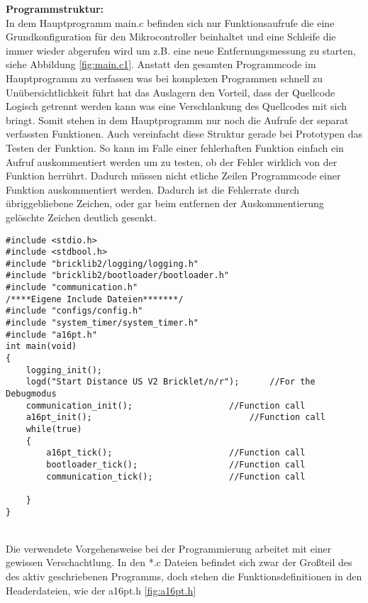 \textbf{Programmstruktur:}\\
In dem Hauptprogramm main.c befinden sich nur Funktionsaufrufe die eine Grundkonfiguration  für den Mikrocontroller beinhaltet und eine Schleife die immer wieder abgerufen wird um z.B. eine neue Entfernungsmessung zu starten, siehe Abbildung \ref{fig:main.c1}. Anstatt den gesamten Programmcode im Hauptprogramm zu verfassen was bei  komplexen Programmen schnell zu Unübersichtlichkeit führt hat das Auslagern den Vorteil, dass der Quellcode Logisch getrennt werden kann was eine Verschlankung des Quellcodes mit sich bringt. Somit stehen in dem Hauptprogramm nur noch die Aufrufe der separat verfassten Funktionen. Auch vereinfacht diese Struktur gerade bei Prototypen das Testen der Funktion. So kann im Falle einer fehlerhaften Funktion einfach ein Aufruf auskommentiert werden um zu testen, ob der Fehler wirklich von der Funktion herrührt. Dadurch müssen nicht etliche Zeilen Programmcode einer Funktion auskommentiert werden. Dadurch ist die Fehlerrate durch übriggebliebene Zeichen, oder gar beim entfernen der Auskommentierung gelöschte Zeichen deutlich gesenkt.\\
\begin{minipage}{1\textwidth}
\begin{lstlisting}
#include <stdio.h>
#include <stdbool.h>
#include "bricklib2/logging/logging.h"
#include "bricklib2/bootloader/bootloader.h"
#include "communication.h"
/****Eigene Include Dateien*******/
#include "configs/config.h"
#include "system_timer/system_timer.h"
#include "a16pt.h"
int main(void)
{ 
	logging_init(); 
	logd("Start Distance US V2 Bricklet/n/r");  	//For the Debugmodus
	communication_init(); 					//Function call
	a16pt_init(); 								//Function call	
	while(true)
	{
		a16pt_tick(); 						//Function call
		bootloader_tick(); 					//Function call
		communication_tick(); 				//Function call
		
	}
}
\end{lstlisting}
\label{fig:main.c1}
\end{minipage}\\
Die verwendete Vorgehensweise bei der Programmierung arbeitet mit einer gewissen Verschachtlung. In den *.c Dateien befindet sich zwar der Großteil des des aktiv geschriebenen Programms, doch stehen die Funktionsdefinitionen in den Headerdateien, wie der a16pt.h \ref{fig:a16pt.h}
